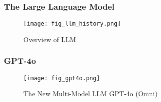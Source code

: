 \begin{frame}
    \frametitle{The Large Language Model}
    \begin{figure}
        \texttt{[image: fig\_llm\_history.png]}
        \caption{Overview of LLM \cite{naveedComprehensiveOverviewLarge2024}}
    \end{figure}
\end{frame}

\begin{frame}
    \frametitle{GPT-4o}
    \begin{figure}
        \texttt{[image: fig\_gpt4o.png]}
        \caption{The New Multi-Model LLM GPT-4o (Omni)}
    \end{figure}
\end{frame}